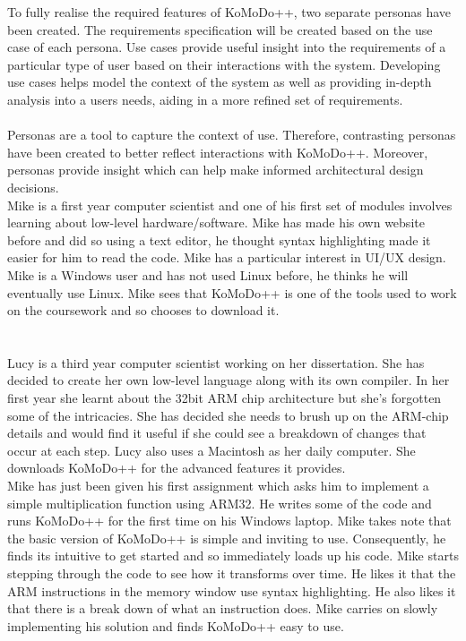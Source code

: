 To fully realise the required features of KoMoDo++, two separate personas have been created. The requirements specification will be created based on the use case of each persona. Use cases provide useful insight into the requirements of a particular type of user based on their interactions with the system. Developing use cases helps model the context of the system as well as providing in-depth analysis into a users needs, aiding in a more refined set of requirements.\\\\
%
Personas are a tool to capture the context of use. Therefore, contrasting personas have been created to better reflect interactions with KoMoDo++. Moreover, personas provide insight which can help make informed architectural design decisions.
%
\\
Mike is a first year computer scientist and one of his first set of modules involves learning about low-level hardware/software. Mike has made his own website before and did so using a text editor, he thought syntax highlighting made it easier for him to read the code. Mike has a particular interest in UI/UX design. Mike is a Windows user and has not used Linux before, he thinks he will eventually use Linux. Mike sees that KoMoDo++ is one of the tools used to work on the coursework and so chooses to download it.\\\\
%
\\
Lucy is a third year computer scientist working on her dissertation. She has decided to create her own low-level language along with its own compiler. In her first year she learnt about the 32bit ARM chip architecture but she's forgotten some of the intricacies. She has decided she needs to brush up on the ARM-chip details and would find it useful if she could see a breakdown of changes that occur at each step. Lucy also uses a Macintosh as her daily computer. She downloads KoMoDo++ for the advanced features it provides.
%
\\
Mike has just been given his first assignment which asks him to implement a simple multiplication function using ARM32. He writes some of the code and runs KoMoDo++ for the first time on his Windows laptop. Mike takes note that the basic version of KoMoDo++ is simple and inviting to use. Consequently, he finds its intuitive to get started and so immediately loads up his code. Mike starts stepping through the code to see how it transforms over time. He likes it that the ARM instructions in the memory window use syntax highlighting. He also likes it that there is a break down of what an instruction does.  Mike carries on slowly implementing his solution and finds KoMoDo++ easy to use.\\\\
